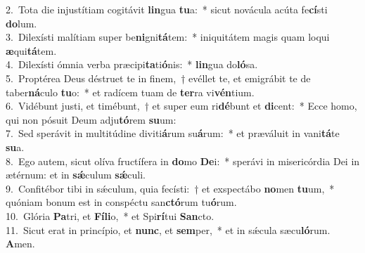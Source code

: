 {2.~}Tota die injustítiam cogitávit \textbf{lin}gua \textbf{tu}a:~* sicut novácula acúta fe\textbf{cí}sti \textbf{do}lum.\\
{3.~}Dilexísti malítiam super be\textbf{ni}gni\textbf{tá}tem:~* iniquitátem magis quam loqui \textbf{æ}qui\textbf{tá}tem.\\
{4.~}Dilexísti ómnia verba præcipi\textbf{ta}ti\textbf{ó}nis:~* \textbf{lin}gua do\textbf{ló}sa.\\
{5.~}Proptérea Deus déstruet te in finem,~† evéllet te, et emigrábit te de taber\textbf{ná}culo \textbf{tu}o:~* et radícem tuam de \textbf{ter}ra vi\textbf{vén}tium.\\
{6.~}Vidébunt justi, et timébunt,~† et super eum ri\textbf{dé}bunt et \textbf{di}cent:~* Ecce homo, qui non pósuit Deum adju\textbf{tó}rem \textbf{su}um:\\
{7.~}Sed sperávit in multitúdine diviti\textbf{á}rum su\textbf{á}rum:~* et præváluit in vani\textbf{tá}te \textbf{su}a.\\
{8.~}Ego autem, sicut olíva fructífera in \textbf{do}mo \textbf{De}i:~* sperávi in misericórdia Dei in ætérnum: et in \textbf{sǽ}culum \textbf{sǽ}culi.\\
{9.~}Confitébor tibi in sǽculum, quia fecísti:~† et exspectábo \textbf{no}men \textbf{tu}um,~* quóniam bonum est in conspéctu san\textbf{ctó}rum tu\textbf{ó}rum.\\
{10.~}Glória \textbf{Pa}tri, et \textbf{Fí}\textbf{li}o,~* et Spi\textbf{rí}tui \textbf{San}cto.\\
{11.~}Sicut erat in princípio, et \textbf{nunc}, et \textbf{sem}per,~* et in sǽcula sæcu\textbf{ló}rum. \textbf{A}men.\\

